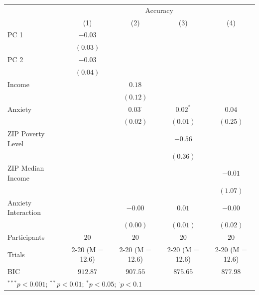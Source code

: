 \documentclass[
]{report}
\begin{document}
\begin{table}
\begin{minipage}[t]{\linewidth}
{\begin{center}
\begin{tabular}{l c c c c}
\hline
 & \multicolumn{4}{c}{Accuracy} \\
\cline{2-5}
 & (1) & (2) & (3) & (4) \\
\hline
PC 1                & $-0.03$         &                 &                 &                 \\
                    & $(0.03)$        &                 &                 &                 \\
PC 2                & $-0.03$         &                 &                 &                 \\
                    & $(0.04)$        &                 &                 &                 \\
Income              &                 & $0.18$          &                 &                 \\
                    &                 & $(0.12)$        &                 &                 \\
Anxiety             &                 & $0.03^{\cdot}$  & $0.02^{*}$      & $0.04$          \\
                    &                 & $(0.02)$        & $(0.01)$        & $(0.25)$        \\
ZIP Poverty Level   &                 &                 & $-0.56$         &                 \\
                    &                 &                 & $(0.36)$        &                 \\
ZIP Median Income   &                 &                 &                 & $-0.01$         \\
                    &                 &                 &                 & $(1.07)$        \\
Anxiety Interaction &                 & $-0.00$         & $0.01$          & $-0.00$         \\
                    &                 & $(0.00)$        & $(0.01)$        & $(0.02)$        \\
\hline
Participants        & $20$            & $20$            & $20$            & $20$            \\
Trials              & 2-20 (M = 12.6) & 2-20 (M = 12.6) & 2-20 (M = 12.6) & 2-20 (M = 12.6) \\
BIC                 & $912.87$        & $907.55$        & $875.65$        & $877.98$        \\
\hline
\multicolumn{5}{l}{\scriptsize{$^{***}p<0.001$; $^{**}p<0.01$; $^{*}p<0.05$; $^{\cdot}p<0.1$}}
\end{tabular}

\label{table:coefficients}
\end{center}

}

\end{minipage}%

\end{table}
\end{document}
